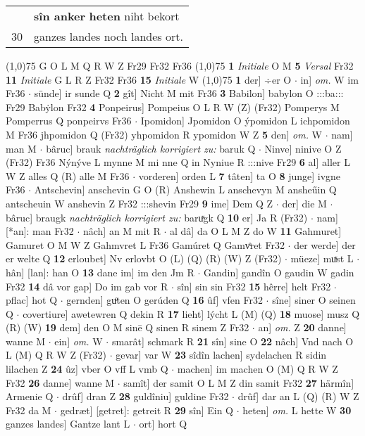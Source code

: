 \documentclass[8pt,a4paper,notitlepage]{article}
\begin{document}
\begin{table}[ht]
\begin{minipage}[t]{0.5\linewidth}
\begin{tabular}{rl}
 & \textbf{sîn anker} \textbf{heten} niht bekort\\ 
30 & ganzes landes noch landes ort.\\ 
\end{tabular}
\scriptsize
\line(1,0){75} \newline
G O L M Q R W Z Fr29 Fr32 Fr36 \newline
\line(1,0){75} \newline
\textbf{1} \textit{Initiale} O M  \textbf{5} \textit{Versal} Fr32  \textbf{11} \textit{Initiale} G L R Z Fr32 Fr36  \textbf{15} \textit{Initiale} W  \newline
\line(1,0){75} \newline
\textbf{1} der] ÷er O  $\cdot$ in] \textit{om.} W im Fr36  $\cdot$ sünde] ir sunde Q \textbf{2} gît] Nicht M mit Fr36 \textbf{3} Babilon] babylon O :::ba::: Fr29 Babẏlon Fr32 \textbf{4} Ponpeirus] Pompeius O L R W (Z) (Fr32) Pomperys M Pomperrus Q ponpeirvs Fr36  $\cdot$ Ipomidon] Jpomidon O ýpomidon L ichpomidon M Fr36 jhpomidon Q (Fr32) yhpomidon R ypomidon W Z \textbf{5} den] \textit{om.} W  $\cdot$ nam] man M  $\cdot$ bâruc] brauk \textit{nachträglich korrigiert zu:} baruk Q  $\cdot$ Ninve] ninive O Z (Fr32) Fr36 Nýnýve L mynne M mi nne Q in Nyniue R :::nive Fr29 \textbf{6} al] aller L W Z alles Q (R) alle M Fr36  $\cdot$ vorderen] orden L \textbf{7} tâten] ta O \textbf{8} junge] ivgne Fr36  $\cdot$ Antschevin] anschevin G O (R) Anshewin L anschevyn M ansheűin Q antscheuin W anshevin Z Fr32 :::shevin Fr29 \textbf{9} ime] Dem Q Z  $\cdot$ der] die M  $\cdot$ bâruc] braugk \textit{nachträglich korrigiert zu:} baruͯgk Q \textbf{10} er] Ja R (Fr32)  $\cdot$ nam] [*an]: man Fr32  $\cdot$ nâch] an M mit R  $\cdot$ al dâ] da O L M Z do W \textbf{11} Gahmuret] Gamuret O M W Z Gahmvret L Fr36 Gamúret Q Gamvͦret Fr32  $\cdot$ der werde] der er welte Q \textbf{12} erloubet] Nv erlovbt O (L) (Q) (R) (W) Z (Fr32)  $\cdot$ müeze] muͯst L  $\cdot$ hân] [lan]: han O \textbf{13} dane im] im den Jm R  $\cdot$ Gandin] gandîn O gaudin W gadin Fr32 \textbf{14} dâ vor gap] Do im gab vor R  $\cdot$ sîn] sin sin Fr32 \textbf{15} hêrre] helt Fr32  $\cdot$ pflac] hot Q  $\cdot$ gernden] guͦten O gerúden Q \textbf{16} ûf] vfen Fr32  $\cdot$ sîne] siner O seinen Q  $\cdot$ covertiure] awetewren Q dekin R \textbf{17} lieht] lýcht L (M) (Q) \textbf{18} muose] musz Q (R) (W) \textbf{19} dem] den O M sinē Q sinen R sinem Z Fr32  $\cdot$ an] \textit{om.} Z \textbf{20} danne] wanne M  $\cdot$ ein] \textit{om.} W  $\cdot$ smarât] schmark R \textbf{21} sîn] sine O \textbf{22} nâch] Vnd nach O L (M) Q R W Z (Fr32)  $\cdot$ gevar] var W \textbf{23} sîdîn lachen] sydelachen R sidin lilachen Z \textbf{24} ûz] vber O vff L vmb Q  $\cdot$ machen] im machen O (M) Q R W Z Fr32 \textbf{26} danne] wanne M  $\cdot$ samît] der samit O L M Z din samit Fr32 \textbf{27} härmîn] Armenie Q  $\cdot$ drûf] dran Z \textbf{28} guldîniu] guldine Fr32  $\cdot$ drûf] dar an L (Q) (R) W Z Fr32 da M  $\cdot$ gedræt] [getret]: getreit R \textbf{29} sîn] Ein Q  $\cdot$ heten] \textit{om.} L hette W \textbf{30} ganzes landes] Gantze lant L  $\cdot$ ort] hort Q \newline

\end{minipage}
\end{table}
\end{document}
